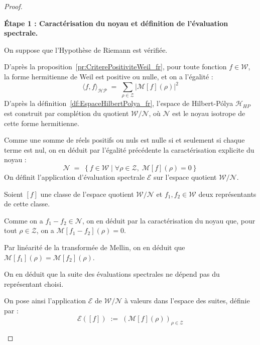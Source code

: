 \documentclass[Riemann_Hypothesis.tex]{subfiles}
\begin{document}
\begin{proof}
    \begin{part_proof}
        \textbf{Étape 1 : Caractérisation du noyau et définition de l'évaluation spectrale.} \par
        On suppose que l'Hypothèse de Riemann est vérifiée. \par
        D'après la {proposition}~\ref{pr:CriterePositiviteWeil_fr}, pour toute fonction $f \in \mathcal{W}$, la forme hermitienne de Weil est positive ou nulle, et on a l'égalité :
        \begin{equation*}
            \langle f, f \rangle_{\mathcal{HP}} \;=\; \sum_{\rho \in \mathcal{Z}} \left| \mathcal{M}[f](\rho) \right|^2
        \end{equation*}
        D'après la définition~\ref{df:EspaceHilbertPolya_fr}, l'espace de Hilbert-Pólya $\mathcal{H}_{HP}$ est construit par complétion du quotient $\mathcal{W} / \mathcal{N}$, où $\mathcal{N}$ est le noyau isotrope de cette forme hermitienne. \par
        Comme une somme de réels positifs ou nuls est nulle si et seulement si chaque terme est nul, on en déduit par l'égalité précédente la caractérisation explicite du noyau :
        \begin{equation*}
            \mathcal{N} \;=\; \left\{ f \in \mathcal{W} \mid \forall \rho \in \mathcal{Z}, \; \mathcal{M}[f](\rho) = 0 \right\}
        \end{equation*}
        On définit l'application d'évaluation spectrale $\mathcal{E}$ sur l'espace quotient $\mathcal{W} / \mathcal{N}$. \par
        Soient $[f]$ une classe de l'espace quotient $\mathcal{W} / \mathcal{N}$ et $f_1, f_2 \in \mathcal{W}$ deux représentants de cette classe. \par
        Comme on a $f_1 - f_2 \in \mathcal{N}$, on en déduit par la caractérisation du noyau que, pour tout $\rho \in \mathcal{Z}$, on a $\mathcal{M}[f_1 - f_2](\rho) = 0$. \par
        Par linéarité de la transformée de Mellin, on en déduit que $\mathcal{M}[f_1](\rho) = \mathcal{M}[f_2](\rho)$. \par
        On en déduit que la suite des évaluations spectrales ne dépend pas du représentant choisi. \par
        On pose ainsi l'application $\mathcal{E}$ de $\mathcal{W} / \mathcal{N}$ à valeurs dans l'espace des suites, définie par :
        \begin{equation*}
            \mathcal{E}([f]) \;:=\; \left( \mathcal{M}[f](\rho) \right)_{\rho \in \mathcal{Z}}
        \end{equation*}
    \end{part_proof}



\end{proof}
\end{document}
